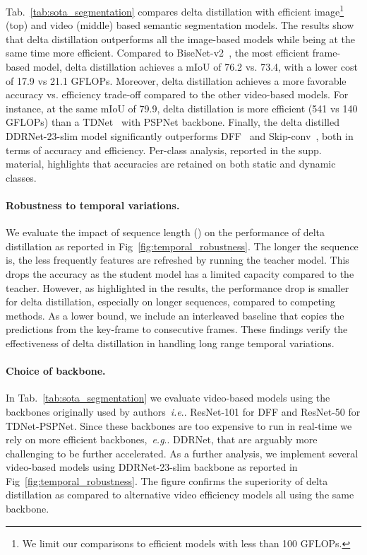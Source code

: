 \documentclass[runningheads]{llncs}
\makeatletter
\DeclareRobustCommand\onedot{\futurelet\@let@token\@onedot}
\def\@onedot{\ifx\@let@token.\else.\null\fi\xspace}
\def\eg{\emph{e.g}\onedot} \def\Eg{\emph{E.g}\onedot}
\def\ie{\emph{i.e}\onedot} \def\Ie{\emph{I.e}\onedot}
\makeatother
\begin{document}
Tab.~\ref{tab:sota_segmentation} compares delta distillation with efficient image\footnote{We limit our comparisons to efficient models with less than 100 GFLOPs.} (top) and video (middle) based semantic segmentation models.
The results show that delta distillation outperforms all the image-based models while being at the same time more efficient. 
Compared to BiseNet-v2~\cite{bisenetv2}, the most efficient frame-based model, delta distillation achieves a mIoU of 76.2 vs. 73.4, with a lower cost of 17.9 vs 21.1 GFLOPs. 
Moreover, delta distillation achieves a more favorable accuracy vs. efficiency trade-off compared to the other video-based models.
For instance, at the same mIoU of 79.9, delta distillation is  more efficient (541 vs 140 GFLOPs) than a TDNet~\cite{hu2020tdnet} with PSPNet backbone. 
Finally, the delta distilled DDRNet-23-slim model significantly outperforms DFF~\cite{zhu17dff} and Skip-conv~\cite{skipconv}, both in terms of accuracy and efficiency.
Per-class analysis, reported in the supp. material, highlights that accuracies are retained on both static and dynamic classes.

\paragraph{Robustness to temporal variations.} We evaluate the impact of sequence length () on the performance of delta distillation as reported in Fig~\ref{fig:temporal_robustness}. The longer the sequence is, the less frequently features are refreshed by running the teacher model. 
This drops the accuracy as the student model has a limited capacity compared to the teacher. 
However, as highlighted in the results, the performance drop is smaller for delta distillation, especially on longer sequences, compared to competing methods. 
As a lower bound, we include an interleaved baseline that copies the predictions from the key-frame to consecutive frames. 
These findings verify the effectiveness of delta distillation in handling long range temporal variations.

\paragraph{Choice of backbone.} In Tab.~\ref{tab:sota_segmentation} we evaluate video-based models using the backbones originally used by authors~\ie ResNet-101 for DFF and ResNet-50 for TDNet-PSPNet. Since these backbones are too expensive to run in real-time we rely on more efficient backbones,~\eg DDRNet, that are arguably more challenging to be further accelerated. As a further analysis, we implement several video-based models using DDRNet-23-slim backbone as reported in Fig~\ref{fig:temporal_robustness}. The figure confirms the superiority of delta distillation as compared to alternative video efficiency models all using the same backbone.
\end{document}
